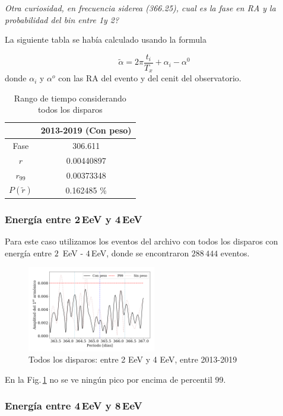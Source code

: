 \emph{Otra curiosidad, en frecuencia siderea (366.25), cual es la fase en RA y la probabilidad del bin entre 1y 2?}

La siguiente tabla se había calculado usando la formula 

\begin{equation}
	\tilde \alpha = 2\pi \frac{t_i}{T_x} +\alpha_i - \alpha^0
\end{equation}
donde $\alpha_i$ y $\alpha^o$ con las RA del evento y del cenit del observatorio.

	\begin{table}[H]
	\centering
		\begin{tabular}{c|c}
	 		&  2013-2019 (Con peso)	 \\ \hline
	Fase		& 	306.611				 \\
	$r$ 		&  0.00440897			\\
	$r_{99}$ 	&  0.00373348			\\
	$P(\tilde r)$ 	    & 	0.162485	\%	 \\
		\end{tabular}
	\caption{Rango de tiempo considerando todos los disparos} 	\label{rango_corto}
	\end{table}


\subsubsection{Energía entre 2\,EeV y 4\,EeV}

Para este caso utilizamos los eventos del archivo con todos los disparos con energía entre $2\,$ EeV - $4\,$EeV, donde se encontraron $288\,444$ eventos.
\begin{figure}[H]
	\centering
	\includegraphics[width=0.5\textwidth]{Graficos/2019_AllTriggers_2_4_EeV_con_vs_sin_peso.png}
	\caption{Todos los disparos: entre 2 EeV y 4 EeV, entre 2013-2019}
	\label{fig:24w}
\end{figure}

En la Fig.\,\ref{fig:24w} no se ve ningún pico por encima de  percentil 99.


\subsubsection{Energía entre 4\,EeV y 8\,EeV}

